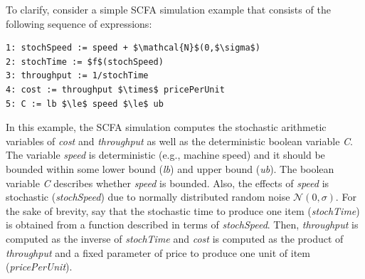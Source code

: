 \documentclass[a4paper, 12pt]{article} %
\begin{document}
\noindent To clarify, consider a simple SCFA simulation example that consists of the following sequence of expressions: 
\begin{lstlisting}
1: stochSpeed := speed + $\mathcal{N}$(0,$\sigma$)
2: stochTime := $f$(stochSpeed)
3: throughput := 1/stochTime
4: cost := throughput $\times$ pricePerUnit
5: C := lb $\le$ speed $\le$ ub
\end{lstlisting}
In this example, the SCFA simulation computes the stochastic arithmetic variables of \textit{cost} and \textit{throughput} as well as the deterministic boolean variable \textit{C}.
The variable \textit{speed} is deterministic (e.g., machine speed) and it should be bounded within some lower bound (\textit{lb}) and upper bound (\textit{ub}).
The boolean variable \textit{C} describes whether \textit{speed} is bounded.
Also, the effects of \textit{speed} is stochastic (\textit{stochSpeed}) due to normally distributed random noise $\mathcal{N}(0,\sigma)$. 
For the sake of brevity, say that the stochastic time to produce one item (\textit{stochTime}) is obtained from a function described in terms of \textit{stochSpeed}.
Then, \textit{throughput} is computed as the inverse of \textit{stochTime} and \textit{cost} is computed as the product of \textit{throughput} and a fixed parameter of price to produce one unit of item (\textit{pricePerUnit}).
\end{document}
